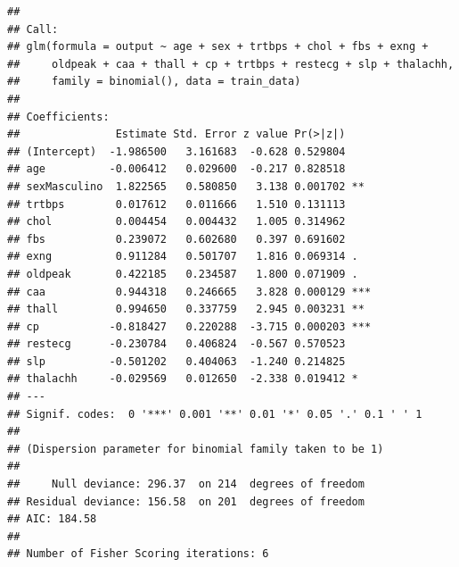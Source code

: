 \documentclass[
]{article}
\newenvironment{Shaded}{\begin{snugshade}}{\end{snugshade}}
\newcommand{\AttributeTok}[1]{\textcolor[rgb]{0.13,0.29,0.53}{#1}}
\newcommand{\CommentTok}[1]{\textcolor[rgb]{0.56,0.35,0.01}{\textit{#1}}}
\newcommand{\ConstantTok}[1]{\textcolor[rgb]{0.56,0.35,0.01}{#1}}
\newcommand{\DecValTok}[1]{\textcolor[rgb]{0.00,0.00,0.81}{#1}}
\newcommand{\FloatTok}[1]{\textcolor[rgb]{0.00,0.00,0.81}{#1}}
\newcommand{\FunctionTok}[1]{\textcolor[rgb]{0.13,0.29,0.53}{\textbf{#1}}}
\newcommand{\NormalTok}[1]{#1}
\newcommand{\OtherTok}[1]{\textcolor[rgb]{0.56,0.35,0.01}{#1}}
\newcommand{\SpecialCharTok}[1]{\textcolor[rgb]{0.81,0.36,0.00}{\textbf{#1}}}
\begin{document}
\begin{Shaded}
\end{Shaded}

\begin{verbatim}
## 
## Call:
## glm(formula = output ~ age + sex + trtbps + chol + fbs + exng + 
##     oldpeak + caa + thall + cp + trtbps + restecg + slp + thalachh, 
##     family = binomial(), data = train_data)
## 
## Coefficients:
##               Estimate Std. Error z value Pr(>|z|)    
## (Intercept)  -1.986500   3.161683  -0.628 0.529804    
## age          -0.006412   0.029600  -0.217 0.828518    
## sexMasculino  1.822565   0.580850   3.138 0.001702 ** 
## trtbps        0.017612   0.011666   1.510 0.131113    
## chol          0.004454   0.004432   1.005 0.314962    
## fbs           0.239072   0.602680   0.397 0.691602    
## exng          0.911284   0.501707   1.816 0.069314 .  
## oldpeak       0.422185   0.234587   1.800 0.071909 .  
## caa           0.944318   0.246665   3.828 0.000129 ***
## thall         0.994650   0.337759   2.945 0.003231 ** 
## cp           -0.818427   0.220288  -3.715 0.000203 ***
## restecg      -0.230784   0.406824  -0.567 0.570523    
## slp          -0.501202   0.404063  -1.240 0.214825    
## thalachh     -0.029569   0.012650  -2.338 0.019412 *  
## ---
## Signif. codes:  0 '***' 0.001 '**' 0.01 '*' 0.05 '.' 0.1 ' ' 1
## 
## (Dispersion parameter for binomial family taken to be 1)
## 
##     Null deviance: 296.37  on 214  degrees of freedom
## Residual deviance: 156.58  on 201  degrees of freedom
## AIC: 184.58
## 
## Number of Fisher Scoring iterations: 6
\end{verbatim}
\end{document}
